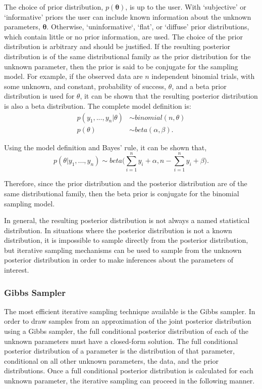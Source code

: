 \documentclass[12pt]{article}\usepackage[]{graphicx}\usepackage[]{color}
\begin{document}
\noindent The choice of prior distribution, $p(\bm{\theta})$, is up to the user. With `subjective' or `informative' priors the user can include known information about the unknown parameters, $\bm{\theta}$. Otherwise, `uninformative`, `flat', or `diffuse' prior distributions, which contain little or no prior information, are used. The choice of the prior distribution is arbitrary and should be justified. If the resulting posterior distribution is of the same distributional family as the prior distribution for the unknown parameter, then the prior is said to be conjugate for the sampling model. For example, if the observed data are $n$ independent binomial trials, with some unknown, and constant, probability of success, $\theta$, and a beta prior distribution is used for $\theta$, it can be shown that the resulting posterior distribution is also a beta distribution. The complete model definition is: 
$$
\begin{aligned}
p(y_1, ..., y_n|\theta) &\sim binomial(n, \theta)\\
p(\theta) &\sim beta(\alpha, \beta).
\end{aligned}
$$

\noindent Using the model definition and Bayes' rule, it can be shown that, 
$$p(\theta|y_1, ..., y_n) \sim beta \bigg( \sum_{i = 1}^n y_i + \alpha, n - \sum_{i = 1}^n y_i + \beta \bigg).$$

\noindent Therefore, since the prior distribution and the posterior distribution are of the same distributional family, then the beta prior is conjugate for the binomial sampling model.

In general, the resulting posterior distribution is not always a named statistical distribution. In situations where the posterior distribution is not a known distribution, it is impossible to sample directly from the posterior distribution, but iterative sampling mechanisms can be used to sample from the unknown posterior distribution in order to make inferences about the parameters of interest. 

\subsubsection{Gibbs Sampler}

The most efficient iterative sampling technique available is the Gibbs sampler. In order to draw samples from an approximation of the joint posterior distribution using a Gibbs sampler, the full conditional posterior distribution of each of the unknown parameters must have a closed-form solution. The full conditional posterior distribution of a parameter is the distribution of that parameter, conditional on all other unknown parameters, the data, and the prior distributions. Once a full conditional posterior distribution is calculated for each unknown parameter, the iterative sampling can proceed in the following manner. 
\end{document}
